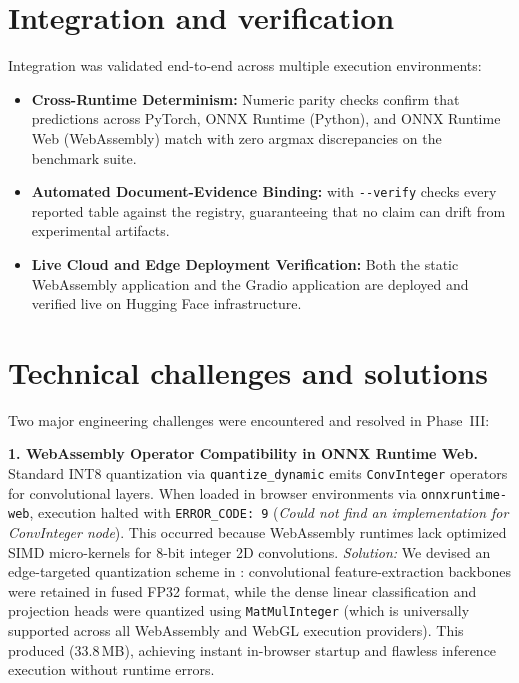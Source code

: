\section{Integration and verification}

Integration was validated end-to-end across multiple execution environments:
\begin{itemize}[leftmargin=1.4em,itemsep=2pt]
\item \textbf{Cross-Runtime Determinism:} Numeric parity checks confirm that predictions across PyTorch,
      ONNX Runtime (Python), and ONNX Runtime Web (WebAssembly) match with zero argmax discrepancies on the benchmark suite.
\item \textbf{Automated Document-Evidence Binding:}  with \texttt{-{}-verify} checks every
      reported table against the registry, guaranteeing that no claim can drift from experimental artifacts.
\item \textbf{Live Cloud and Edge Deployment Verification:} Both the static WebAssembly application
      and the Gradio application are deployed and verified live on Hugging Face infrastructure.
\end{itemize}

\section{Technical challenges and solutions}

Two major engineering challenges were encountered and resolved in Phase~III:

\textbf{1. WebAssembly Operator Compatibility in ONNX Runtime Web.} Standard INT8 quantization via
\texttt{quantize\_dynamic} emits \texttt{ConvInteger} operators for convolutional layers. When loaded
in browser environments via \texttt{onnxruntime-web}, execution halted with \texttt{ERROR\_CODE: 9}
(\emph{Could not find an implementation for ConvInteger node}). This occurred because WebAssembly
runtimes lack optimized SIMD micro-kernels for 8-bit integer 2D convolutions.
\emph{Solution:} We devised an edge-targeted quantization scheme in :
convolutional feature-extraction backbones were retained in fused FP32 format, while the dense linear
classification and projection heads were quantized using \texttt{MatMulInteger} (which is universally
supported across all WebAssembly and WebGL execution providers). This produced
 (33.8\,MB), achieving instant in-browser startup and flawless
inference execution without runtime errors.

